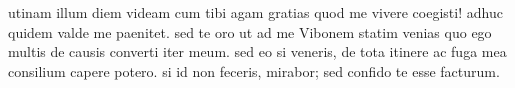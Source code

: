 


utinam illum diem videam cum tibi agam gratias quod me vivere coegisti! adhuc quidem
            valde me paenitet. sed te oro ut ad me Vibonem statim venias quo
            ego multis de causis converti iter meum. sed eo si veneris, de tota itinere
            ac fuga mea consilium capere potero. si id non feceris, mirabor; sed confido
            te esse facturum.
